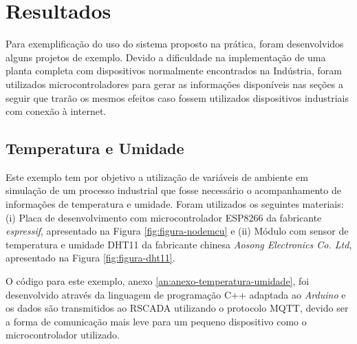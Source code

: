 \chapter{Resultados}
\label{chap:resultados}

Para exemplificação do uso do sistema proposto na prática, foram desenvolvidos alguns projetos de exemplo. Devido a dificuldade na implementação de uma planta completa com dispositivos normalmente encontrados na Indústria, foram utilizados microcontroladores para gerar as informações disponíveis nas seções a seguir que trarão os mesmos efeitos caso fossem utilizados dispositivos industriais com conexão à internet.

\section{Temperatura e Umidade}
\label{sec:temperatura-umidade}

Este exemplo tem por objetivo a utilização de variáveis de ambiente em simulação de um processo industrial que fosse necessário o acompanhamento de informações de temperatura e umidade. Foram utilizados os seguintes materiais: (i) Placa de desenvolvimento com microcontrolador ESP8266 da fabricante \textit{espressif}, apresentado na Figura \ref{fig:figura-nodemcu} e (ii) Módulo com sensor de temperatura e umidade DHT11 da fabricante chinesa \textit{Aosong Electronics Co. Ltd}, apresentado na Figura \ref{fig:figura-dht11}.

O código para este exemplo, anexo \ref{an:anexo-temperatura-umidade}, foi desenvolvido através da linguagem de programação C++ adaptada ao \textit{Arduino} e os dados são transmitidos ao RSCADA utilizando o protocolo \gls{MQTT}, devido ser a forma de comunicação mais leve para um pequeno dispositivo como o microcontrolador utilizado.

        \begin{figure}[!h]
    	\end{figure}
    	
